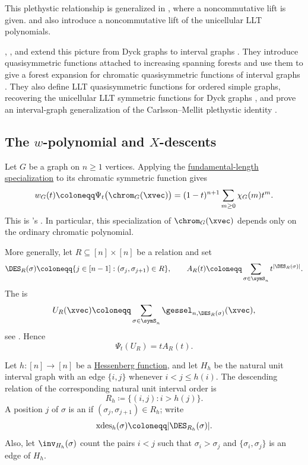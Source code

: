 This plethystic relationship is generalized in \cite[Thm.~6.2]{NovelliThibon2019},
where a noncommutative lift is given.
 and
 also introduce a noncommutative lift
of the unicellular LLT polynomials.

, , and
 extend this picture from Dyck graphs to interval
graphs \cite{DAdderioRiccardiSiconolfi2023x}.  They introduce
quasisymmetric functions attached to increasing spanning forests and use them
to give a forest expansion for chromatic quasisymmetric functions of interval
graphs \cite[Thm.~7.2]{DAdderioRiccardiSiconolfi2023x}.  They also define
LLT quasisymmetric functions for ordered simple graphs, recovering the
unicellular LLT symmetric functions for Dyck graphs
\cite[Thm.~7.7]{DAdderioRiccardiSiconolfi2023x}, and prove an interval-graph
generalization of the Carlsson--Mellit plethystic identity
\cite[Thm.~10.1]{DAdderioRiccardiSiconolfi2023x}.


\subsection[chromaticWPolynomial]{The $w$-polynomial and $X$-descents}

Let $G$ be a graph on $n\geq1$ vertices.  Applying the
\hyperref[gesselLengthSpecialization]{fundamental-length specialization} to
its chromatic symmetric function gives
\[
 w_G(t)
 \coloneqq
 \Psi_t\bigl(\chrom_G(\xvec)\bigr)
 =(1-t)^{n+1}\sum_{m\geq0}\chi_G(m)t^m.
\]
This is 's 
\cite[Prop.~4.1]{Brenti1992}.  In particular, this specialization of
$\chrom_G(\xvec)$ depends only on the ordinary chromatic polynomial.

More generally, let $R\subseteq[n]\times[n]$ be a relation and set
\[
 \DES_R(\sigma)
 \coloneqq
 \{j\in[n-1]:(\sigma_j,\sigma_{j+1})\in R\},
 \qquad
 A_R(t)\coloneqq\sum_{\sigma\in\symS_n}t^{|\DES_R(\sigma)|}.
\]
The  is
\[
 U_R(\xvec)
 \coloneqq
 \sum_{\sigma\in\symS_n}\gessel_{n,\DES_R(\sigma)}(\xvec),
\]
see \cite[Def.~1.15]{GrinbergStanley2023x}.  Hence
\[
 \Psi_t(U_R)=tA_R(t).
\]

Let $h:[n]\to[n]$ be a
\hyperref[hessenbergFunction]{Hessenberg function}, and let $H_h$ be the
natural unit interval graph with an edge $\{i,j\}$ whenever $i<j\leq h(i)$.
The descending relation of the corresponding natural unit interval order is
\[
 R_h\coloneqq\{(i,j):i>h(j)\}.
\]
A position $j$ of $\sigma$ is an  if
$(\sigma_j,\sigma_{j+1})\in R_h$; write
\[
 \operatorname{xdes}_h(\sigma)
 \coloneqq |\DES_{R_h}(\sigma)|.
\]
Also, let $\inv_{H_h}(\sigma)$ count the pairs $i<j$ such that
$\sigma_i>\sigma_j$ and $\{\sigma_i,\sigma_j\}$ is an edge of $H_h$.

